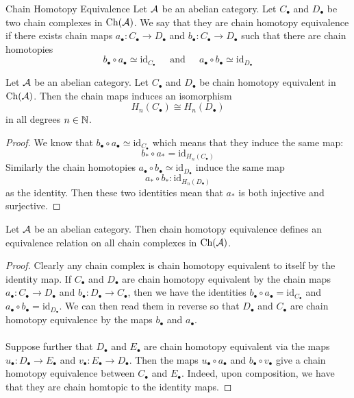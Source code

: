 \documentclass[a4paper]{article}
\begin{document}
\begin{defn}{Chain Homotopy Equivalence}{} Let $\mathcal{A}$ be an abelian category. Let $C_\bullet$ and $D_\bullet$ be two chain complexes in $\text{Ch}(\mathcal{A})$. We say that they are chain homotopy equivalence if there exists chain maps $a_\bullet:C_\bullet\to D_\bullet$ and $b_\bullet:C_\bullet\to D_\bullet$ such that there are chain homotopies $$b_\bullet\circ a_\bullet\simeq\text{id}_{C_\bullet}\;\;\;\;\text{ and }\;\;\;\;a_\bullet\circ b_\bullet\simeq\text{id}_{D_\bullet}$$
\end{defn}

\begin{lmm}{}{} Let $\mathcal{A}$ be an abelian category. Let $C_\bullet$ and $D_\bullet$ be chain homotopy equivalent in $\text{Ch}(\mathcal{A})$. Then the chain maps induces an isomorphism $$H_n(C_\bullet)\cong H_n(D_\bullet)$$ in all degrees $n\in\mathbb{N}$. \tcbline
\begin{proof}
We know that $b_\bullet\circ a_\bullet\simeq\text{id}_{C_\bullet}$ which means that they induce the same map: $$b_\ast\circ a_\ast=\text{id}_{H_n(C_\bullet)}$$ Similarly the chain homotopies $a_\bullet\circ b_\bullet\simeq\text{id}_{D_\bullet}$ induce the same map $$a_\ast\circ b_\ast:\text{id}_{H_n(D_\bullet)}$$ as the identity. Then these two identities mean that $a_\ast$ is both injective and surjective. 
\end{proof}
\end{lmm}

\begin{prp}{}{} Let $\mathcal{A}$ be an abelian category. Then chain homotopy equivalence defines an equivalence relation on all chain complexes in $\text{Ch}(\mathcal{A})$. \tcbline
\begin{proof}
Clearly any chain complex is chain homotopy equivalent to itself by the identity map. If $C_\bullet$ and $D_\bullet$ are chain homotopy equivalent by the chain maps $a_\bullet:C_\bullet\to D_\bullet$ and $b_\bullet:D_\bullet\to C_\bullet$, then we have the identities $b_\bullet\circ a_\bullet=\text{id}_{C_\bullet}$ and $a_\bullet\circ b_\bullet=\text{id}_{D_\bullet}$. We can then read them in reverse so that $D_\bullet$ and $C_\bullet$ are chain homotopy equivalence by the maps $b_\bullet$ and $a_\bullet$. \\~\\

Suppose further that $D_\bullet$ and $E_\bullet$ are chain homotopy equivalent via the maps $u_\bullet:D_\bullet\to E_\bullet$ and $v_\bullet:E_\bullet\to D_\bullet$. Then the maps $u_\bullet\circ a_\bullet$ and $b_\bullet\circ v_\bullet$ give a chain homotopy equivalence between $C_\bullet$ and $E_\bullet$. Indeed, upon composition, we have that they are chain  homtopic to the identity maps. 
\end{proof}
\end{prp}
\end{document}
